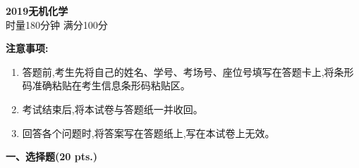 \begin{center}
    {\LARGE \textbf{2019无机化学}} \\[2ex]
    {\large 时量180分钟 \quad 满分100分}
\end{center}

\vspace{0.5cm}
\noindent\textbf{注意事项:}
\begin{enumerate}[label=\arabic*., parsep=0pt, itemsep=0pt]
    \item 答题前,考生先将自己的姓名、学号、考场号、座位号填写在答题卡上,将条形码准确粘贴在考生信息条形码粘贴区。
    \item 考试结束后,将本试卷与答题纸一并收回。
    \item 回答各个问题时,将答案写在答题纸上,写在本试卷上无效。
\end{enumerate}

\vspace{0.5cm}
\noindent\textbf{一、选择题(20 pts.)}

